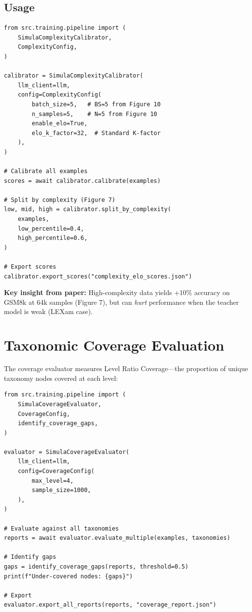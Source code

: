 \subsection{Usage}

\begin{lstlisting}[language=jsonx,caption={Complexity calibrator usage}]
from src.training.pipeline import (
    SimulaComplexityCalibrator,
    ComplexityConfig,
)

calibrator = SimulaComplexityCalibrator(
    llm_client=llm,
    config=ComplexityConfig(
        batch_size=5,   # BS=5 from Figure 10
        n_samples=5,    # N=5 from Figure 10
        enable_elo=True,
        elo_k_factor=32,  # Standard K-factor
    ),
)

# Calibrate all examples
scores = await calibrator.calibrate(examples)

# Split by complexity (Figure 7)
low, mid, high = calibrator.split_by_complexity(
    examples,
    low_percentile=0.4,
    high_percentile=0.6,
)

# Export scores
calibrator.export_scores("complexity_elo_scores.json")
\end{lstlisting}

\textbf{Key insight from paper:} High-complexity data yields +10\% accuracy on GSM8k
at 64k samples (Figure 7), but can \emph{hurt} performance when the teacher model
is weak (LEXam case).

\section{Taxonomic Coverage Evaluation}

The coverage evaluator measures Level Ratio Coverage---the proportion of unique
taxonomy nodes covered at each level:

\begin{lstlisting}[language=jsonx,caption={Coverage evaluator usage}]
from src.training.pipeline import (
    SimulaCoverageEvaluator,
    CoverageConfig,
    identify_coverage_gaps,
)

evaluator = SimulaCoverageEvaluator(
    llm_client=llm,
    config=CoverageConfig(
        max_level=4,
        sample_size=1000,
    ),
)

# Evaluate against all taxonomies
reports = await evaluator.evaluate_multiple(examples, taxonomies)

# Identify gaps
gaps = identify_coverage_gaps(reports, threshold=0.5)
print(f"Under-covered nodes: {gaps}")

# Export
evaluator.export_all_reports(reports, "coverage_report.json")
\end{lstlisting}

